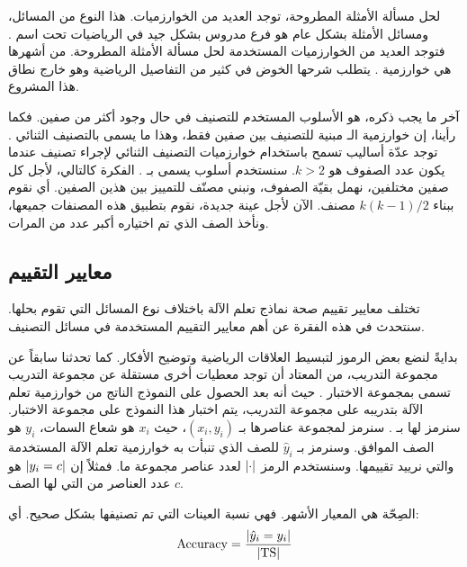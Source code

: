 لحل مسألة الأمثلة المطروحة، توجد العديد من الخوارزميات. هذا النوع من المسائل، ومسائل الأمثلة بشكل عام هو فرع
مدروس بشكل جيد في الرياضيات تحت اسم .
فتوجد العديد من الخوارزميات المستخدمة لحل مسألة الأمثلة المطروحة.
من أشهرها هي خوارزمية
%
. يتطلب شرحها الخوض في كثير من التفاصيل الرياضية وهو خارج نطاق هذا المشروع.




آخر ما يجب ذكره، هو الأسلوب المستخدم للتصنيف في حال وجود أكثر من صفين.
فكما رأينا، إن خوارزمية الـ  مبنية للتصنيف بين صفين فقط، وهذا ما يسمى بالتصنيف الثنائي .
توجد عدّة أساليب تسمح باستخدام خوارزميات التصنيف الثنائي لإجراء تصنيف عندما يكون عدد الصفوف هو $ k > 2 $.
سنستخدم أسلوب يسمى بـ
%
. الفكرة كالتالي، لأجل كل صفين مختلفين، نهمل بقيّة الصفوف، ونبني مصنّف للتمييز بين هذين الصفين.
أي نقوم ببناء $ k(k-1)/2 $ مصنف.
الآن لأجل عينة جديدة، نقوم بتطبيق هذه المصنفات جميعها، ونأخذ الصف الذي تم اختياره أكبر عدد من المرات.



\subsection{معايير التقييم}
\label{sec:metrics}
تختلف معايير تقييم صحة نماذج تعلم الآلة باختلاف نوع المسائل التي تقوم بحلها.
سنتحدث في هذه الفقرة عن أهم معايير التقييم المستخدمة في مسائل التصنيف.

بدايةً لنضع بعض الرموز لتبسيط العلاقات الرياضية وتوضيح الأفكار.
كما تحدثنا سابقاً عن مجموعة التدريب،
من المعتاد أن توجد معطيات أخرى مستقلة عن مجموعة التدريب تسمى بمجموعة الاختبار .
حيث أنه بعد الحصول على النموذج الناتج من خوارزمية تعلم الآلة بتدريبه على مجموعة التدريب،
يتم اختبار هذا النموذج على مجموعة الاختبار.
سنرمز لها بـ .
سنرمز لمجموعة عناصرها بـ $ (x_i, y_i) $، حيث $x_i$ هو شعاع السمات، $y_i$ هو الصف الموافق.
وسنرمز بـ $\hat{y}_i$ للصف الذي تنبأت به خوارزمية تعلم الآلة المستخدمة والتي نرييد تقييمها.
وسنستخدم الرمز $ \left\vert\cdot\right\vert $ لعدد عناصر مجموعة ما.
فمثلاً إن $ \left\vert y_i = c\right\vert $ هو عدد العناصر من  التي لها الصف $c$.

الصِحّة  هي المعيار الأشهر. فهي نسبة العينات التي تم تصنيفها بشكل صحيح. أي:
$$ \mathrm{Accuracy} = \frac{ \left\vert\hat{y}_i = y_i\right\vert }{ \left\vert \mathrm{TS} \right\vert } $$

